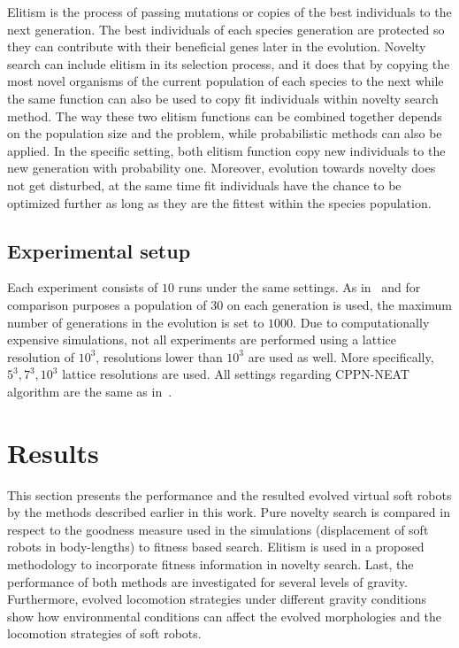 \documentclass{sig-alternate}
\begin{document}
Elitism is the process of passing mutations or copies of the best individuals to the next generation. The best individuals of each species generation are protected so they can contribute with their beneficial genes later in the evolution. Novelty search can include elitism in its selection process, and it does that by copying the most novel organisms of the current population of each species to the next while the same function can also be used to copy fit individuals within novelty search method. The way these two elitism functions can be combined together depends on the population size and the problem, while probabilistic methods can also be applied. In the specific setting, both elitism function copy new individuals to the new generation with probability one. Moreover, evolution towards novelty does not get disturbed, at the same time fit individuals have the chance to be optimized further as long as they are the fittest within the species population. 

\subsection{Experimental setup}
Each experiment consists of $10$ runs under the same settings. As in~\cite{cheney2013unshackling} and for comparison purposes a population of $30$ on each generation is used, the maximum number of generations in the evolution is set to $1000$. Due to computationally expensive simulations, not all experiments are performed using a lattice resolution of $10^3$, resolutions lower than $10^3$ are used as well. More specifically, $5^3, 7^3, 10^3$ lattice resolutions are used. All settings regarding CPPN-NEAT algorithm are the same as in~\cite{cheney2013unshackling}.


\section{Results}
This section presents the performance and the resulted evolved virtual soft robots by the methods described earlier in this work. Pure novelty search is compared in respect to the goodness measure used in the simulations (displacement of soft robots in body-lengths) to fitness based search. Elitism is used in a proposed methodology to incorporate fitness information in novelty search. Last, the performance of both methods are investigated for several levels of gravity. Furthermore, evolved locomotion strategies under different gravity conditions show how environmental conditions can affect the evolved morphologies and the locomotion strategies of soft robots.
\end{document}
